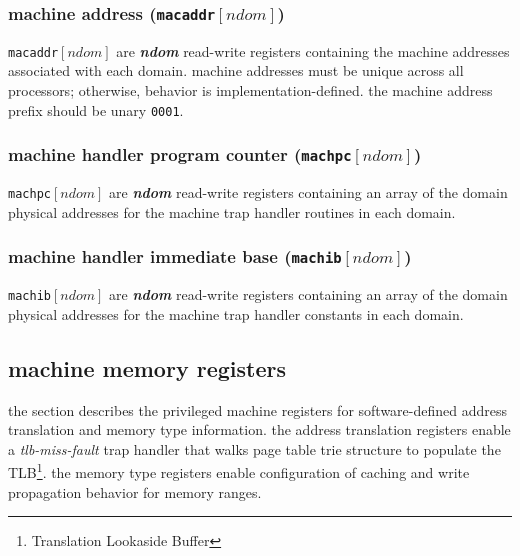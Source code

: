 \subsubsection{machine address (\texttt{macaddr}$[\mathit{ndom}]$)}
\texttt{macaddr}$[\mathit{ndom}]$ are \textbf{\emph{ndom}} read-write
registers containing the machine addresses associated with each domain.
machine addresses must be unique across all processors; otherwise,
behavior is implementation-defined.
the machine address prefix should be unary \texttt{0001}.
\\

\subsubsection{machine handler program counter (\texttt{machpc}$[\mathit{ndom}]$)}
\texttt{machpc}$[\mathit{ndom}]$ are \textbf{\emph{ndom}} read-write
registers containing an array of the domain physical addresses for the
machine trap handler routines in each domain.
\\

\subsubsection{machine handler immediate base (\texttt{machib}$[\mathit{ndom}]$)}
\texttt{machib}$[\mathit{ndom}]$ are \textbf{\emph{ndom}} read-write
registers containing an array of the domain physical addresses for the
machine trap handler constants in each domain.
\\

\newpage
\subsection{machine memory registers}

the section describes the privileged machine registers for software-defined
address translation and memory type information. the address translation
registers enable a \emph{tlb-miss-fault} trap handler that walks page table
trie structure to populate the TLB\footnote{Translation Lookaside Buffer}.
the memory type registers enable configuration of caching and write
propagation behavior for memory ranges.

